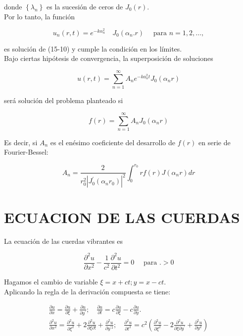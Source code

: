 \documentclass[10pt]{article}
\theoremstyle{plain}
\theoremstyle{definition}
\theoremstyle{remark}
\begin{document}
donde $\left\{\lambda_{n}\right\}$ es la sucesión de ceros de $J_{0}(r)$.\\
Por lo tanto, la función

$$
u_{n}(r, t)=e^{-k \alpha_{n}^{2}} \quad J_{0}\left(\alpha_{n} . r\right) \quad \text { para } n=1,2, \ldots,
$$

es solución de (15-10) y cumple la condición en los límites.\\
Bajo ciertas hipótesis de convergencia, la superposición de soluciones

$$
u(r, t)=\sum_{n=1}^{\infty} A_{n} e^{-k a_{n}^{2} t} J_{0}\left(\alpha_{n} r\right)
$$

será solución del problema planteado si

$$
f(r)=\sum_{n=1}^{\infty} A_{n} J_{0}\left(\alpha_{n} r\right)
$$

Es decir, si $A_{n}$ es el enésimo coeficiente del desarrollo de $f(r)$ en serie de Fourier-Bessel:

$$
A_{n}=\frac{2}{r_{0}^{2}\left|J_{0}^{\prime}\left(\alpha_{n} r_{0}\right)\right|^{2}} \int_{0}^{r_{0}} r f(r) J\left(\alpha_{n} r\right) d r
$$

\section*{ECUACION DE LAS CUERDAS}
La ecuación de las cuerdas vibrantes es


\begin{equation*}
\frac{\partial^{2} u}{\partial x^{2}}-\frac{1}{c^{2}} \frac{\partial^{2} u}{\partial t^{2}}=0 \quad \text { para } .>0 \tag{$15\cdot12$}
\end{equation*}


Hagamos el cambio de variable $\xi=x+c t ; y=x-c t$.\\
Aplicando la regla de la derivación compuesta se tiene:

$$
\begin{gathered}
\frac{\partial u}{\partial x}=\frac{\partial u}{\partial \xi}+\frac{\partial u}{\partial y^{\prime}} ; \quad \frac{\partial u}{\partial t}=c \frac{\partial u}{\partial \xi}-c \frac{\partial u}{\partial y} . \\
\frac{\partial^{2} u}{\partial x^{2}}=\frac{\partial^{2} u}{\partial \xi^{2}}+2 \frac{\partial^{2} u}{\partial \xi \partial!}+\frac{\partial^{2} u}{\partial y^{\prime 2}} ; \quad \frac{\partial^{2} u}{\partial t^{2}}=c^{2}\left(\frac{\partial^{2} u}{\partial \xi^{2}}-2 \frac{\partial^{2} u}{\partial \xi \partial y^{\prime}}+\frac{\partial^{2} u}{\partial y^{2}}\right)
\end{gathered}
$$
\end{document}
